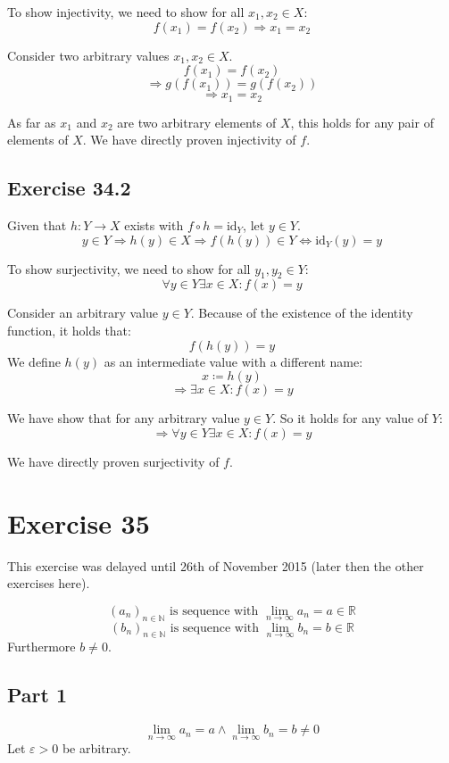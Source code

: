 \documentclass[a4paper]{article}
\theoremstyle{definition}
\begin{document}
To show injectivity, we need to show for all $x_1, x_2 \in X$:
\[ f(x_1) = f(x_2) \Rightarrow x_1 = x_2 \]

Consider two arbitrary values $x_1, x_2 \in X$.
\[ f(x_1) = f(x_2) \]
\[ \Rightarrow g(f(x_1)) = g(f(x_2)) \]
\[ \Rightarrow x_1 = x_2 \]

As far as $x_1$ and $x_2$ are two arbitrary elements of $X$, this holds for any pair of elements of $X$.
We have directly proven injectivity of $f$.

\subsection{Exercise 34.2}
%
Given that $h: Y \rightarrow X$ exists with $f \circ h = \text{id}_Y$,
let $y \in Y$.
\[ y \in Y \Rightarrow h(y) \in X \Rightarrow f(h(y)) \in Y \Leftrightarrow \text{id}_Y(y) = y \]

To show surjectivity, we need to show for all $y_1, y_2 \in Y$:
\[ \forall y \in Y \exists x \in X: f(x) = y \]

Consider an arbitrary value $y \in Y$. Because of the existence of the identity function, it holds that:
\[ f(h(y)) = y \]
We define $h(y)$ as an intermediate value with a different name:
\[ x \coloneqq h(y) \]
\[ \Rightarrow \exists x \in X: f(x) = y \]

We have show that for any arbitrary value $y \in Y$. So it holds for any value of $Y$:
\[ \Rightarrow \forall y \in Y \exists x \in X: f(x) = y \]

We have directly proven surjectivity of $f$.


\section{Exercise 35}

This exercise was delayed until 26th of November 2015 (later then the other exercises here).

\[ (a_n)_{n \in \mathbb N} \text{ is sequence with } \lim_{n \to \infty} a_n = a \in \mathbb R \]
\[ (b_n)_{n \in \mathbb N} \text{ is sequence with } \lim_{n \to \infty} b_n = b \in \mathbb R \]
Furthermore $b \neq 0$.

\subsection{Part 1}

\[ \lim_{n\to\infty} a_n = a \land \lim_{n\to\infty} b_n = b \neq 0 \]
Let $\varepsilon > 0$ be arbitrary.
\end{document}

